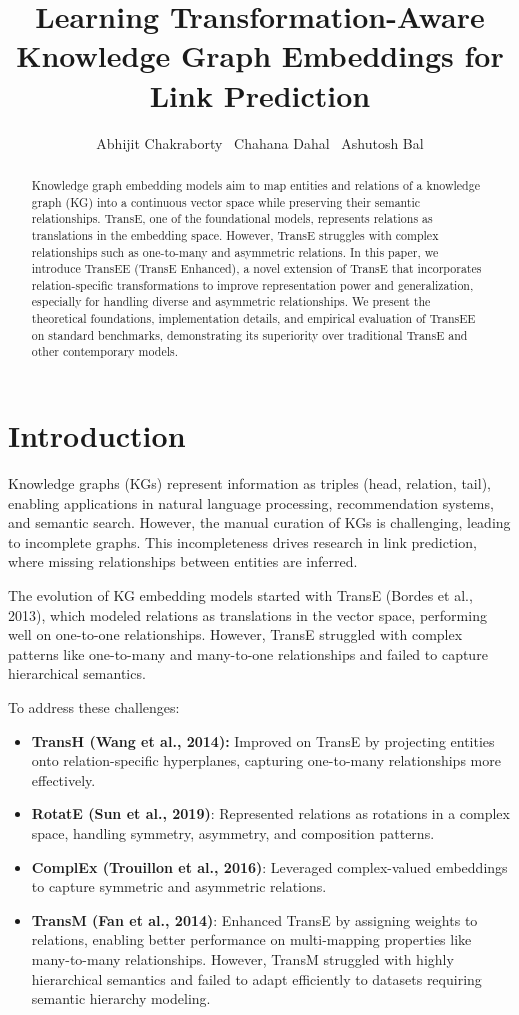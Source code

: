 \documentclass[11pt]{article}
\title{Learning Transformation-Aware Knowledge Graph Embeddings for Link Prediction}
\author{Abhijit Chakraborty  \ Chahana Dahal \ Ashutosh Bal}
\date{}
\begin{document}
\maketitle

\begin{abstract}
Knowledge graph embedding models aim to map entities and relations of a knowledge graph (KG) into a continuous vector space while preserving their semantic relationships. TransE, one of the foundational models, represents relations as translations in the embedding space. However, TransE struggles with complex relationships such as one-to-many and asymmetric relations. In this paper, we introduce TransEE (TransE Enhanced), a novel extension of TransE that incorporates relation-specific transformations to improve representation power and generalization, especially for handling diverse and asymmetric relationships. We present the theoretical foundations, implementation details, and empirical evaluation of TransEE on standard benchmarks, demonstrating its superiority over traditional TransE and other contemporary models.
\end{abstract}

\section{Introduction}

Knowledge graphs (KGs) represent information as triples (head, relation, tail), enabling applications in natural language processing, recommendation systems, and semantic search. However, the manual curation of KGs is challenging, leading to incomplete graphs. This incompleteness drives research in link prediction, where missing relationships between entities are inferred.

The evolution of KG embedding models started with TransE (Bordes et al., 2013), which modeled relations as translations in the vector space, performing well on one-to-one relationships. However, TransE struggled with complex patterns like one-to-many and many-to-one relationships and failed to capture hierarchical semantics.

To address these challenges:
\begin{itemize}
    \item \textbf{TransH (Wang et al., 2014):} Improved on TransE by projecting entities onto relation-specific hyperplanes, capturing one-to-many relationships more effectively.
    \item \textbf{RotatE (Sun et al., 2019)}: Represented relations as rotations in a complex space, handling symmetry, asymmetry, and composition patterns.
    \item \textbf{ComplEx (Trouillon et al., 2016)}: Leveraged complex-valued embeddings to capture symmetric and asymmetric relations.
    \item \textbf{TransM (Fan et al., 2014)}: Enhanced TransE by assigning weights to relations, enabling better performance on multi-mapping properties like many-to-many relationships. However, TransM struggled with highly hierarchical semantics and failed to adapt efficiently to datasets requiring semantic hierarchy modeling.
\end{itemize}
\end{document}
